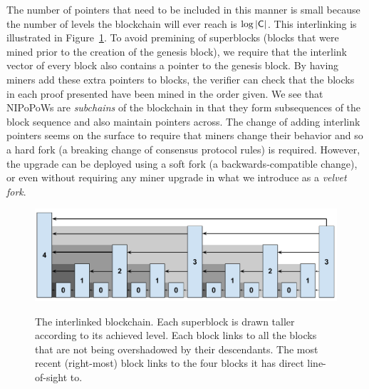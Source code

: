 The number of pointers that need to be included in this manner is small because
the number of levels the blockchain will ever reach is $\log|\mathsf{C}|$. This
interlinking is illustrated in Figure~\ref{fig.hierarchy}. To avoid premining of
superblocks (blocks that were mined prior to the creation of the genesis block),
we require that the interlink vector of every block also contains a pointer to
the genesis block. By having miners add these extra pointers to blocks, the
verifier can check that the blocks in each proof presented have been mined in
the order given. We see that NIPoPoWs are \emph{subchains} of the blockchain in
that they form subsequences of the block sequence and also maintain pointers
across. The change of adding interlink pointers seems on the surface to require
that miners change their behavior and so a hard fork (a breaking change of
consensus protocol rules) is required. However, the upgrade can be deployed
using a soft fork (a backwards-compatible change), or even without requiring any
miner upgrade in what we introduce as a \emph{velvet fork}.

\begin{figure}[ht]
    \caption{The interlinked blockchain. Each superblock is drawn taller
    according to its achieved level. Each block links to all the blocks that are
    not being overshadowed by their descendants. The most recent (right-most)
    block links to the four blocks it has direct line-of-sight to.}
    \centering
    \includegraphics[width=0.9\columnwidth,keepaspectratio]{chapters/introduction/figures/level-shadows.pdf}
    \label{fig.hierarchy}
\end{figure}



